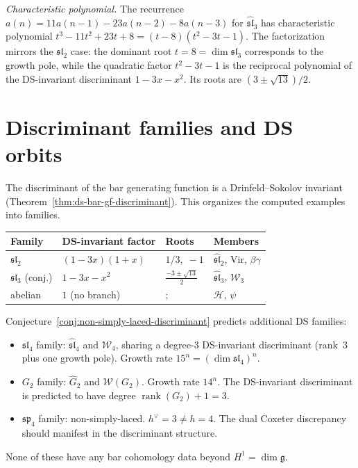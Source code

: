 \emph{Characteristic polynomial.}
The recurrence $a(n) = 11a(n{-}1) - 23a(n{-}2) - 8a(n{-}3)$ for $\widehat{\mathfrak{sl}}_3$ has characteristic polynomial $t^3 - 11t^2 + 23t + 8 = (t-8)(t^2-3t-1)$. The factorization mirrors the $\mathfrak{sl}_2$ case: the dominant root $t = 8 = \dim\mathfrak{sl}_3$ corresponds to the growth pole, while the quadratic factor $t^2 - 3t - 1$ is the reciprocal polynomial of the DS-invariant discriminant $1 - 3x - x^2$. Its roots are $(3 \pm \sqrt{13})/2$.

\section{Discriminant families and DS orbits}
\label{sec:discriminant-families}

The discriminant of the bar generating function is a Drinfeld--Sokolov invariant (Theorem~\ref{thm:ds-bar-gf-discriminant}). This organizes the computed examples into families.

\begin{center}
\renewcommand{\arraystretch}{1.4}
\begin{tabular}{llll}
\toprule
\textbf{Family} & \textbf{DS-invariant factor} & \textbf{Roots} & \textbf{Members} \\
\midrule
$\mathfrak{sl}_2$ & $(1-3x)(1+x)$ & $1/3,\; -1$ & $\widehat{\mathfrak{sl}}_2$, $\mathrm{Vir}$, $\beta\gamma$ \\
$\mathfrak{sl}_3$ (conj.) & $1-3x-x^2$ & $\frac{-3\pm\sqrt{13}}{2}$ & $\widehat{\mathfrak{sl}}_3$, $\mathcal{W}_3$ \\
abelian & $1$ (no branch) &; & $\mathcal{H}$, $\psi$ \\
\bottomrule
\end{tabular}
\end{center}

\begin{remark}
Conjecture~\ref{conj:non-simply-laced-discriminant} predicts additional DS families:
\begin{itemize}
\item $\mathfrak{sl}_4$ family: $\widehat{\mathfrak{sl}}_4$ and $\mathcal{W}_4$, sharing a degree-$3$ DS-invariant discriminant (rank~$3$ plus one growth pole). Growth rate $15^n = (\dim\mathfrak{sl}_4)^n$.
\item $G_2$ family: $\widehat{G}_2$ and $\mathcal{W}(G_2)$. Growth rate $14^n$. The DS-invariant discriminant is predicted to have degree $\operatorname{rank}(G_2) + 1 = 3$.
\item $\mathfrak{sp}_4$ family: non-simply-laced. $h^\vee = 3 \neq h = 4$. The dual Coxeter discrepancy should manifest in the discriminant structure.
\end{itemize}
None of these have any bar cohomology data beyond $H^1 = \dim\mathfrak{g}$.
\end{remark}


